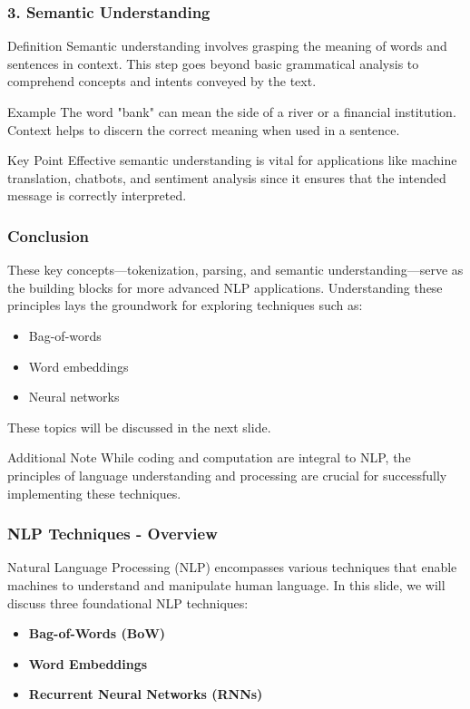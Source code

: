 \documentclass[aspectratio=169]{beamer}
\begin{document}
\begin{frame}[fragile]
    \frametitle{3. Semantic Understanding}
    \begin{block}{Definition}
        Semantic understanding involves grasping the meaning of words and sentences in context. This step goes beyond basic grammatical analysis to comprehend concepts and intents conveyed by the text.
    \end{block}

    \begin{block}{Example}
        The word "bank" can mean the side of a river or a financial institution. Context helps to discern the correct meaning when used in a sentence.
    \end{block}

    \begin{block}{Key Point}
        Effective semantic understanding is vital for applications like machine translation, chatbots, and sentiment analysis since it ensures that the intended message is correctly interpreted.
    \end{block}
\end{frame}

\begin{frame}[fragile]
    \frametitle{Conclusion}
    These key concepts—tokenization, parsing, and semantic understanding—serve as the building blocks for more advanced NLP applications. Understanding these principles lays the groundwork for exploring techniques such as:
    \begin{itemize}
        \item Bag-of-words
        \item Word embeddings
        \item Neural networks
    \end{itemize}
    These topics will be discussed in the next slide. 

    \begin{block}{Additional Note}
        While coding and computation are integral to NLP, the principles of language understanding and processing are crucial for successfully implementing these techniques.
    \end{block}
\end{frame}

\begin{frame}[fragile]
  \frametitle{NLP Techniques - Overview}
  Natural Language Processing (NLP) encompasses various techniques that enable machines to understand and manipulate human language. In this slide, we will discuss three foundational NLP techniques:
  \begin{itemize}
    \item \textbf{Bag-of-Words (BoW)}
    \item \textbf{Word Embeddings}
    \item \textbf{Recurrent Neural Networks (RNNs)}
  \end{itemize}
\end{frame}
\end{document}
